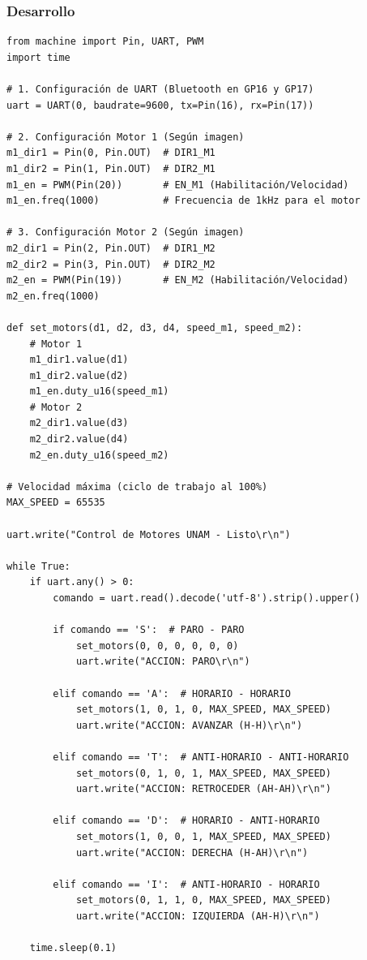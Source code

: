 \newpage
\subsubsection{Desarrollo}
\begin{lstlisting}
from machine import Pin, UART, PWM
import time

# 1. Configuración de UART (Bluetooth en GP16 y GP17)
uart = UART(0, baudrate=9600, tx=Pin(16), rx=Pin(17))

# 2. Configuración Motor 1 (Según imagen)
m1_dir1 = Pin(0, Pin.OUT)  # DIR1_M1
m1_dir2 = Pin(1, Pin.OUT)  # DIR2_M1
m1_en = PWM(Pin(20))       # EN_M1 (Habilitación/Velocidad)
m1_en.freq(1000)           # Frecuencia de 1kHz para el motor

# 3. Configuración Motor 2 (Según imagen)
m2_dir1 = Pin(2, Pin.OUT)  # DIR1_M2
m2_dir2 = Pin(3, Pin.OUT)  # DIR2_M2
m2_en = PWM(Pin(19))       # EN_M2 (Habilitación/Velocidad)
m2_en.freq(1000)

def set_motors(d1, d2, d3, d4, speed_m1, speed_m2):
    # Motor 1
    m1_dir1.value(d1)
    m1_dir2.value(d2)
    m1_en.duty_u16(speed_m1)
    # Motor 2
    m2_dir1.value(d3)
    m2_dir2.value(d4)
    m2_en.duty_u16(speed_m2)

# Velocidad máxima (ciclo de trabajo al 100%)
MAX_SPEED = 65535 

uart.write("Control de Motores UNAM - Listo\r\n")

while True:
    if uart.any() > 0:
        comando = uart.read().decode('utf-8').strip().upper()
        
        if comando == 'S':  # PARO - PARO
            set_motors(0, 0, 0, 0, 0, 0)
            uart.write("ACCION: PARO\r\n")
            
        elif comando == 'A':  # HORARIO - HORARIO
            set_motors(1, 0, 1, 0, MAX_SPEED, MAX_SPEED)
            uart.write("ACCION: AVANZAR (H-H)\r\n")
            
        elif comando == 'T':  # ANTI-HORARIO - ANTI-HORARIO
            set_motors(0, 1, 0, 1, MAX_SPEED, MAX_SPEED)
            uart.write("ACCION: RETROCEDER (AH-AH)\r\n")
            
        elif comando == 'D':  # HORARIO - ANTI-HORARIO
            set_motors(1, 0, 0, 1, MAX_SPEED, MAX_SPEED)
            uart.write("ACCION: DERECHA (H-AH)\r\n")
            
        elif comando == 'I':  # ANTI-HORARIO - HORARIO
            set_motors(0, 1, 1, 0, MAX_SPEED, MAX_SPEED)
            uart.write("ACCION: IZQUIERDA (AH-H)\r\n")

    time.sleep(0.1)
\end{lstlisting}

